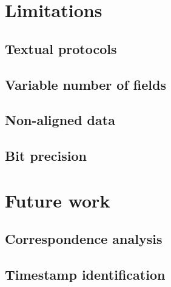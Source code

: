 \documentclass[a4paper]{report}
\begin{document}
\section{Limitations}

\subsection{Textual protocols}

\subsection{Variable number of fields}

\subsection{Non-aligned data}

\subsection{Bit precision}

\section{Future work}

\subsection{Correspondence analysis}

\subsection{Timestamp identification}



\end{document}
